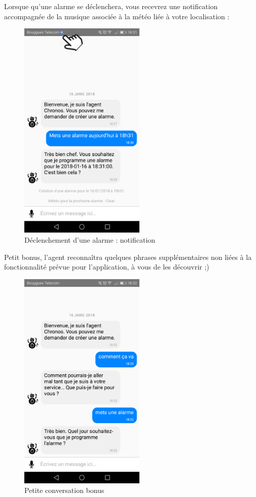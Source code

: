 Lorsque qu'une alarme se déclenchera, vous recevrez une notification accompagnée de la musique associée à la météo liée à votre localisation :

\begin{figure}[H]
  \centering
  \includegraphics[width=6cm]{images/H.png}
  \caption{Déclenchement d'une alarme : notification}
\end{figure}

Petit bonus, l'agent reconnaîtra quelques phrases supplémentaires non liées à la fonctionnalité prévue pour l'application, à vous de les découvrir ;)

\begin{figure}[H]
  \centering
  \includegraphics[width=6cm]{images/J.png}
  \caption{Petite conversation bonus}
\end{figure}
